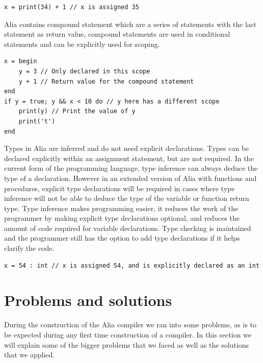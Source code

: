 \documentclass[paper=a4, fontsize=11pt]{article}
\numberwithin{equation}{section}		%
\numberwithin{figure}{section}			%
\numberwithin{table}{section}				%
\begin{document}
\begin{lstlisting}
x = print(34) + 1 // x is assigned 35
\end{lstlisting}

Alia contains compound statement which are a series of statements with the last statement as return value, compound statements are used in conditional statements and can be explicitly used for scoping.

\begin{lstlisting}
x = begin
    y = 3 // Only declared in this scope
    y + 1 // Return value for the compound statement
end
if y = true; y && x < 10 do // y here has a different scope
    print(y) // Print the value of y
    print('t')
end
\end{lstlisting}

Types in Alia are inferred and do not need explicit declarations. Types can be declared explicitly within an assignment statement, but are not required. In the current form of the programming language, type inference can always deduce the type of a declaration. However in an extended version of Alia with functions and procedures, explicit type declarations will be required in cases where type inference will not be able to deduce the type of the variable or function return type. Type inference makes programming easier, it reduces the work of the programmer by making explicit type declarations optional, and reduces the amount of code required for variable declarations. Type checking is maintained and the programmer still has the option to add type declarations if it helps clarify the code.

\begin{lstlisting}
x = 54 : int // x is assigned 54, and is explicitly declared as an int
\end{lstlisting}



\section{Problems and solutions}
During the construction of the Alia compiler we ran into some problems, as is to be expected during any first time construction of a compiler. In this section we will explain some of the bigger problems that we faced as well as the solutions that we applied.
\end{document}
